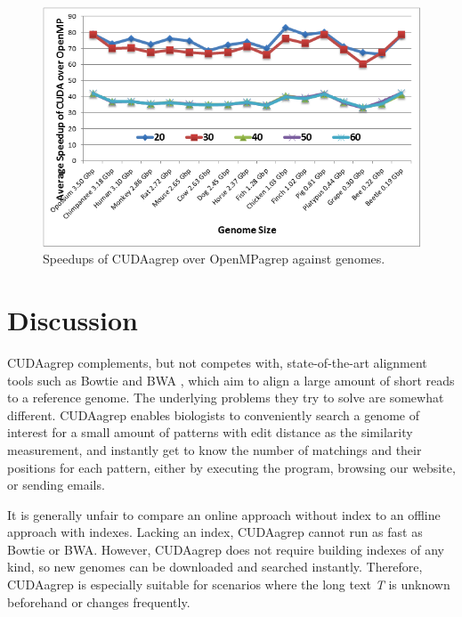 \begin{figure}
\centering
\includegraphics[width=\textwidth]{SequenceMatching/Figures/SpeedupAgainstGenomes.png}
\caption{Speedups of CUDAagrep over OpenMPagrep against genomes.}
\label{fig:SpeedupAgainstGenomes}
\end{figure}

\section{Discussion}

CUDAagrep complements, but not competes with, state-of-the-art alignment tools such as Bowtie \citep{450-2009} and BWA \citep{251-2009}, which aim to align a large amount of short reads to a reference genome. The underlying problems they try to solve are somewhat different. CUDAagrep enables biologists to conveniently search a genome of interest for a small amount of patterns with edit distance as the similarity measurement, and instantly get to know the number of matchings and their positions for each pattern, either by executing the program, browsing our website, or sending emails.

It is generally unfair to compare an online approach without index to an offline approach with indexes. Lacking an index, CUDAagrep cannot run as fast as Bowtie or BWA. However, CUDAagrep does not require building indexes of any kind, so new genomes can be downloaded and searched instantly. Therefore, CUDAagrep is especially suitable for scenarios where the long text \textit{T} is unknown beforehand or changes frequently.

